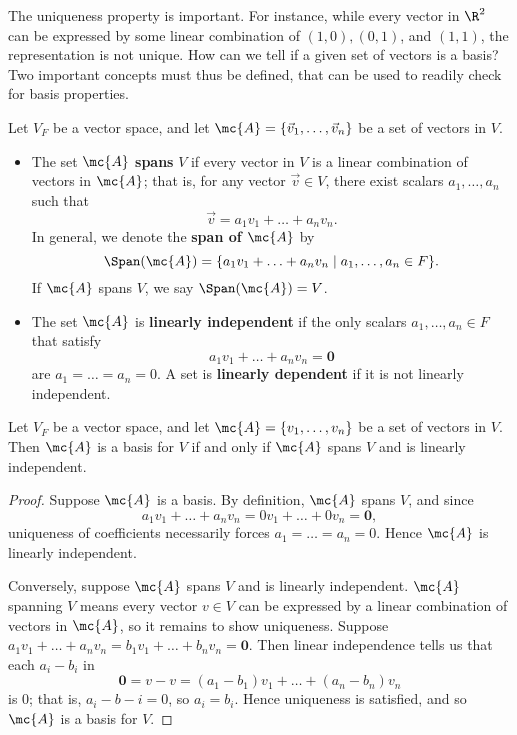 \documentclass[math1530-lecture-notes]{subfiles}
\begin{document}
The uniqueness property is important. For instance, while every vector in $\R^2$ can be expressed by
some linear combination of $(1,0),(0,1)$, and $(1,1)$, the representation is not unique. How can we
tell if a given set of vectors is a basis? Two important concepts must thus be defined, that can be
used to readily check for basis properties.
\begin{definition}{}
  Let $V_F$ be a vector space, and let $\mc{A}=\{ \vec{v}_1,\ldots,\vec{v}_n \}$ be a set of vectors
  in $V$.
  \begin{itemize}
    \item The set $\mc{A}$ \textbf{spans} $V$ if every vector in $V$ is a linear combination of
      vectors in $\mc{A}$; that is, for any vector $\vec{v}\in V$, there exist scalars
      $a_1,\ldots,a_n$ such that \[
        \vec{v}=a_1v_1+\ldots+a_nv_n
      .\] In general, we denote the \textbf{span of $\mc{A}$} by \[
         \Span(\mc{A})= \{a_1v_1+\ldots+a_nv_n\mid a_1,\ldots,a_n\in F\} 
      .\] If $\mc{A}$ spans $V$, we say $\Span(\mc{A})=V$.
    \item The set $\mc{A}$ is \textbf{linearly independent} if the only scalars $a_1,\ldots,a_n\in
      F$ that satisfy \[
        a_1v_1+\ldots+a_nv_n=\textbf{0}
      \] are $a_1=\ldots=a_n=0$. A set is \textbf{linearly dependent} if it is not linearly
      independent.
  \end{itemize}
\end{definition}

\begin{proposition}{}
  Let $V_F$ be a vector space, and let $\mc{A}=\{ v_1,\ldots,v_n \}$ be a set of vectors in $V$.
  Then $\mc{A}$ is a basis for $V$ if and only if $\mc{A}$ spans $V$ and is linearly independent.
\end{proposition}
\begin{proof}[Proof]
  Suppose $\mc{A}$ is a basis. By definition, $\mc{A}$ spans $V$, and since \[
    a_1v_1+\ldots+a_nv_n=0v_1+\ldots+0v_n=\textbf{0}
  ,\] uniqueness of coefficients necessarily forces $a_1=\ldots=a_n=0$. Hence $\mc{A}$ is linearly
  independent.

  Conversely, suppose $\mc{A}$ spans $V$ and is linearly independent. $\mc{A}$ spanning $V$ means
  every vector $v\in V$ can be expressed by a linear combination of vectors in $\mc{A}$, so it
  remains to show uniqueness. Suppose $a_1v_1+\ldots+a_nv_n=b_1v_1+\ldots+b_nv_n=\textbf{0}$. Then
  linear independence tells us that each $a_i-b_i$ in \[
    \textbf{0}=v-v=(a_1-b_1)v_1+\ldots+(a_n-b_n)v_n
  \] is $0$; that is, $a_i-b-i=0$, so $a_i=b_i$. Hence uniqueness is satisfied, and so $\mc{A}$ is a
  basis for $V$.
\end{proof}
\end{document}
